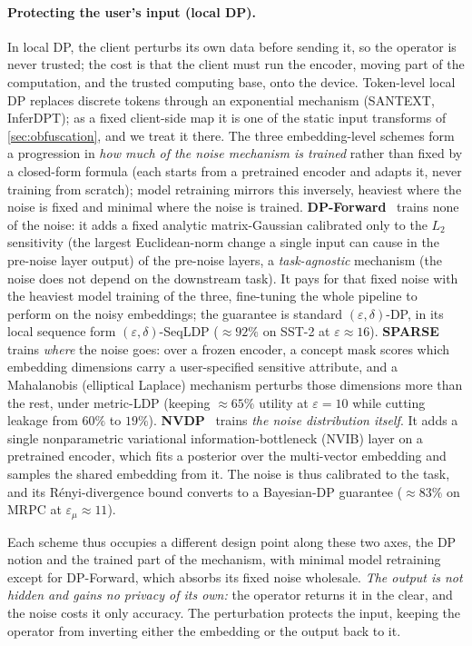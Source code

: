\paragraph{Protecting the user's input (local DP).}
In local DP, the client perturbs its own data before sending it, so the operator is never
trusted; the cost is that the client must run the encoder, moving part of the computation, and the
trusted computing base, onto the device. Token-level local DP replaces discrete tokens through an exponential
mechanism (SANTEXT, InferDPT); as a fixed client-side map it is one of the static input transforms
of \cref{sec:obfuscation}, and we treat it there. The three embedding-level schemes form a progression in \emph{how much of the noise mechanism is
trained} rather than fixed by a closed-form formula (each starts from a pretrained encoder and adapts
it, never training from scratch); model retraining mirrors this inversely,
heaviest where the noise is fixed and minimal where the noise is trained.
\textbf{DP-Forward}~\cite{du_dpforward} trains none of the noise: it adds a fixed analytic
matrix-Gaussian calibrated only to the $L_2$ sensitivity (the largest Euclidean-norm change a single
input can cause in the pre-noise layer output) of the pre-noise layers, a
\emph{task-agnostic} mechanism (the noise does not depend on the downstream task). It pays for that
fixed noise with the heaviest model training of the three, fine-tuning the whole pipeline to perform
on the noisy embeddings; the guarantee is standard $(\varepsilon,\delta)$-DP, in its local sequence
form $(\varepsilon,\delta)$-SeqLDP (${\approx}92\%$ on SST-2 at $\varepsilon{\approx}16$). \textbf{SPARSE}~\cite{sparse_dp}
trains \emph{where} the noise goes: over a frozen encoder, a concept mask scores which embedding
dimensions carry a user-specified sensitive attribute, and a Mahalanobis (elliptical Laplace) mechanism
perturbs those dimensions more than the rest, under metric-LDP (keeping ${\approx}65\%$ utility at
$\varepsilon{=}10$ while cutting leakage from $60\%$ to $19\%$). \textbf{NVDP}~\cite{nvdp} trains
\emph{the noise distribution itself}. It adds a single nonparametric variational
information-bottleneck (NVIB) layer on a pretrained encoder, which fits a posterior over the
multi-vector embedding and samples the shared embedding from it. The noise is thus calibrated to the
task, and its Rényi-divergence bound converts to a Bayesian-DP guarantee (${\approx}83\%$ on MRPC at
$\varepsilon_\mu{\approx}11$).

Each scheme thus occupies a different design point along these two axes, the DP notion and the
trained part of the mechanism, with minimal model retraining except for DP-Forward, which absorbs
its fixed noise wholesale.
\emph{The output is not hidden and gains no privacy of its own:} the operator returns it in the clear, and
the noise costs it only accuracy. The perturbation protects the input, keeping the operator
from inverting either the embedding or the output back to it.

